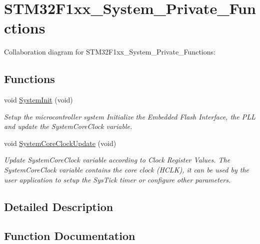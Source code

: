 \hypertarget{group__STM32F1xx__System__Private__Functions}{}\section{S\+T\+M32\+F1xx\+\_\+\+System\+\_\+\+Private\+\_\+\+Functions}
\label{group__STM32F1xx__System__Private__Functions}
Collaboration diagram for S\+T\+M32\+F1xx\+\_\+\+System\+\_\+\+Private\+\_\+\+Functions\+:
\subsection*{Functions}
\begin{DoxyCompactItemize}
\item 
void \hyperlink{group__STM32F1xx__System__Private__Functions_ga93f514700ccf00d08dbdcff7f1224eb2}{System\+Init} (void)
\begin{DoxyCompactList}\small\item\em Setup the microcontroller system Initialize the Embedded Flash Interface, the P\+LL and update the System\+Core\+Clock variable. \end{DoxyCompactList}\item 
void \hyperlink{group__STM32F1xx__System__Private__Functions_gae0c36a9591fe6e9c45ecb21a794f0f0f}{System\+Core\+Clock\+Update} (void)
\begin{DoxyCompactList}\small\item\em Update System\+Core\+Clock variable according to Clock Register Values. The System\+Core\+Clock variable contains the core clock (H\+C\+LK), it can be used by the user application to setup the Sys\+Tick timer or configure other parameters. \end{DoxyCompactList}\end{DoxyCompactItemize}


\subsection{Detailed Description}


\subsection{Function Documentation}
\mbox{\label{group__STM32F1xx__System__Private__Functions_gae0c36a9591fe6e9c45ecb21a794f0f0f}} 
